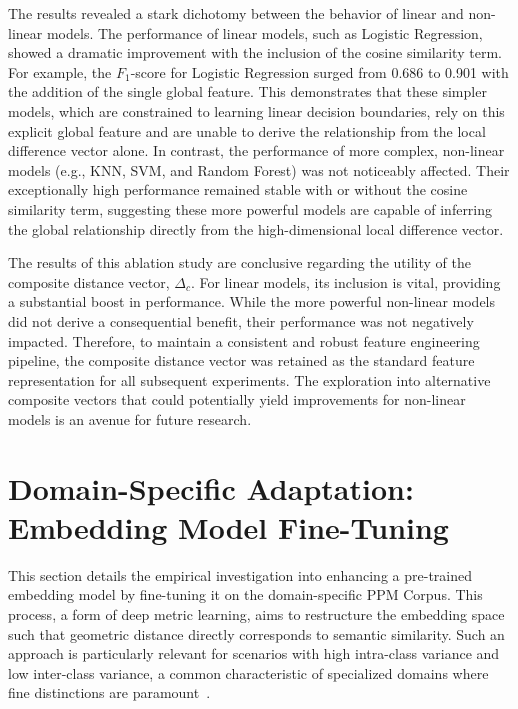 The results revealed a stark dichotomy between the behavior of linear and non-linear models. The performance of linear models, such as Logistic Regression, showed a dramatic improvement with the inclusion of the cosine similarity term. For example, the \(F_1\)-score for Logistic Regression surged from 0.686 to 0.901 with the addition of the single global feature. This demonstrates that these simpler models, which are constrained to learning linear decision boundaries, rely on this explicit global feature and are unable to derive the relationship from the local difference vector alone. In contrast, the performance of more complex, non-linear models (e.g., KNN, SVM, and Random Forest) was not noticeably affected. Their exceptionally high performance remained stable with or without the cosine similarity term, suggesting these more powerful models are capable of inferring the global relationship directly from the high-dimensional local difference vector.

The results of this ablation study are conclusive regarding the utility of the composite distance vector, \(\Delta_c\). For linear models, its inclusion is vital, providing a substantial boost in performance. While the more powerful non-linear models did not derive a consequential benefit, their performance was not negatively impacted. Therefore, to maintain a consistent and robust feature engineering pipeline, the composite distance vector was retained as the standard feature representation for all subsequent experiments. The exploration into alternative composite vectors that could potentially yield improvements for non-linear models is an avenue for future research.

\section{Domain-Specific Adaptation: Embedding Model Fine-Tuning}\label{ch:4.4}
This section details the empirical investigation into enhancing a pre-trained embedding model by fine-tuning it on the domain-specific PPM Corpus. This process, a form of deep metric learning, aims to restructure the embedding space such that geometric distance directly corresponds to semantic similarity. Such an approach is particularly relevant for scenarios with high intra-class variance and low inter-class variance, a common characteristic of specialized domains where fine distinctions are paramount~\cite{mohan2023deepmetriclearningcomputer}.

